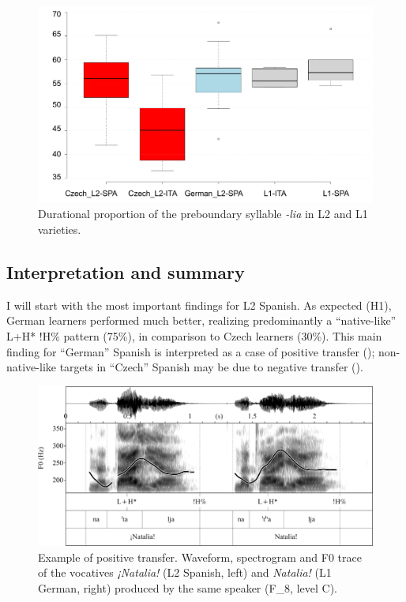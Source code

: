 \begin{figure}


\includegraphics[width=\textwidth]{figures/Figure_149.pdf}



\caption{Durational proportion of the preboundary syllable \textit{{}-lia} in L2 and L1 varieties.}
\label{fig:4.149}
\end{figure}

\subsection{Interpretation and summary}\label{sec:4.5.5}
\begin{sloppypar}
I will start with the most important findings for L2 Spanish. As expected (H1), German learners performed much better, realizing predominantly a “native-like” L+H* !H\% pattern (75\%), in comparison to Czech learners (30\%). This main finding for “German” Spanish is interpreted as a case of positive transfer (); non-native-like targets in “Czech” Spanish may be due to negative transfer ().
\end{sloppypar}

\begin{figure}

\includegraphics[width=\textwidth]{figures/Figure_4.150.png}



\caption{Example of positive transfer. Waveform, spectrogram and F0 trace of the vocatives \textit{¡Natalia!} (L2 Spanish, left) and \textit{Natalia!} (L1 German, right) produced by the same speaker (F\_8, level C).}
\label{fig:4.150}
\end{figure}


